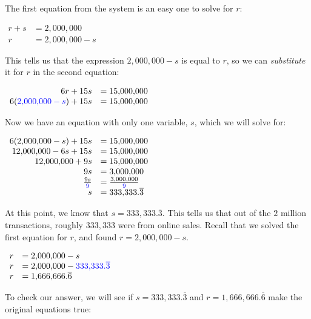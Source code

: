 \documentclass[nooutcomes]{ximera}
\begin{document}
\begin{example}
        The first equation from the system is an easy one to solve for $r$:
\begin{center}
$
\begin{array}{rl}
          r+s &=2{,}000{,}000\\
          r &=2{,}000{,}000-s
\end{array}
$
\end{center}
        This tells us that the expression
        $2{,}000{,}000-s$ is equal to $r$,
        so we can \textit{substitute} it for $r$ in the second equation:
\begin{center}
        $
\begin{array}{rl}
          6r+15s &=15{,}000{,}000\\
          6({\color{blue}{{2{,}000{,}000-s}}})+15s &=15{,}000{,}000
\end{array}
$
\end{center}
          Now we have an equation with only one variable, $s$, which we will solve for:
\begin{center}
$
\begin{array}{rl}
          6(2{,}000{,}000-s)+15s &=15{,}000{,}000\\
          12{,}000{,}000-6s+15s &=15{,}000{,}000\\
          12{,}000{,}000+9s &= 15{,}000{,}000\\
              9s &= 3{,}000{,}000\\
          \frac{9s}{{\color{blue}{{9}}}} &= \frac{3{,}000{,}000}{{\color{blue}{{9}}}}\\
          s &= 333{,}333.\overline{3}
\end{array}
$
\end{center}
        At this point, we know that $s=333{,}333.\overline{3}$.
        This tells us that out of the $2$ million transactions,
        roughly $333{,}333$ were from online sales.
        Recall that we solved the first equation for $r$,
        and found $r=2{,}000{,}000-s$.
\begin{center}
$
\begin{array}{rl}
          r &=2{,}000{,}000-s \\
          r &=2{,}000{,}000-{\color{blue}{{333{,}333.\overline{3}}}}\\
          r &=1{,}666{,}666.\overline{6}
\end{array}
$
\end{center}
        To check our answer, we will see if $s=333{,}333.\overline{3}$ and
        $r=1{,}666{,}666.\overline{6}$ make the original equations true:
\begin{center}

\end{center}
\end{example}
\end{document}
